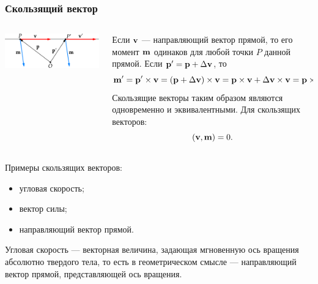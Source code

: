 \begin{frame}
  \frametitle{Скользящий вектор}
  \begin{columns}
    \begin{column}{0.4\textwidth}
      \begin{center}
        \includegraphics{img/screws/moment02}
      \end{center}
    \end{column}
    \begin{column}{0.6\textwidth}
      Если $\vb{v}$ — направляющий вектор прямой, то его момент $\vb{m}$ одинаков для любой точки $P$ данной прямой. Если $\vb{p}^{\prime} = \vb{p} + \Delta \vb{v}$, то
      \begin{equation*}
        \vb{m}^{\prime} = \vb{p}^{\prime} \times \vb{v} = (\vb{p} + \Delta \vb{v})\times \vb{v} = \vb{p} \times \vb{v} + \Delta \vb{v} \times \vb{v} = \vb{p} \times \vb{v} = \vb{m}.
      \end{equation*}
      Скользящие векторы таким образом являются одновременно и эквивалентными.
      Для скользящих векторов:
        \begin{equation*}
          (\vb{v}, \vb{m}) = 0.
        \end{equation*}
    \end{column}
  \end{columns}
  Примеры скользящих векторов:
  \begin{itemize}
    \item угловая скорость;
    \item вектор силы;
    \item направляющий вектор прямой.
  \end{itemize}
  Угловая скорость — векторная величина, задающая мгновенную ось вращения абсолютно твердого тела, то есть в геометрическом смысле — направляющий вектор прямой, представляющей ось вращения.
\end{frame}


